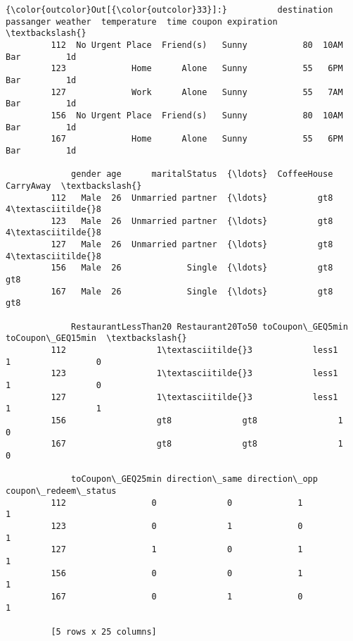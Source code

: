 \documentclass[11pt]{article}
\begin{document}
\begin{Verbatim}[commandchars=\\\{\}]
{\color{outcolor}Out[{\color{outcolor}33}]:}          destination  passanger weather  temperature  time coupon expiration  \textbackslash{}
         112  No Urgent Place  Friend(s)   Sunny           80  10AM    Bar         1d   
         123             Home      Alone   Sunny           55   6PM    Bar         1d   
         127             Work      Alone   Sunny           55   7AM    Bar         1d   
         156  No Urgent Place  Friend(s)   Sunny           80  10AM    Bar         1d   
         167             Home      Alone   Sunny           55   6PM    Bar         1d   
         
             gender age      maritalStatus  {\ldots}  CoffeeHouse CarryAway  \textbackslash{}
         112   Male  26  Unmarried partner  {\ldots}          gt8       4\textasciitilde{}8   
         123   Male  26  Unmarried partner  {\ldots}          gt8       4\textasciitilde{}8   
         127   Male  26  Unmarried partner  {\ldots}          gt8       4\textasciitilde{}8   
         156   Male  26             Single  {\ldots}          gt8       gt8   
         167   Male  26             Single  {\ldots}          gt8       gt8   
         
             RestaurantLessThan20 Restaurant20To50 toCoupon\_GEQ5min toCoupon\_GEQ15min  \textbackslash{}
         112                  1\textasciitilde{}3            less1                1                 0   
         123                  1\textasciitilde{}3            less1                1                 0   
         127                  1\textasciitilde{}3            less1                1                 1   
         156                  gt8              gt8                1                 0   
         167                  gt8              gt8                1                 0   
         
             toCoupon\_GEQ25min direction\_same direction\_opp  coupon\_redeem\_status  
         112                 0              0             1                     1  
         123                 0              1             0                     1  
         127                 1              0             1                     1  
         156                 0              0             1                     1  
         167                 0              1             0                     1  
         
         [5 rows x 25 columns]
\end{Verbatim}
            
\end{document}
